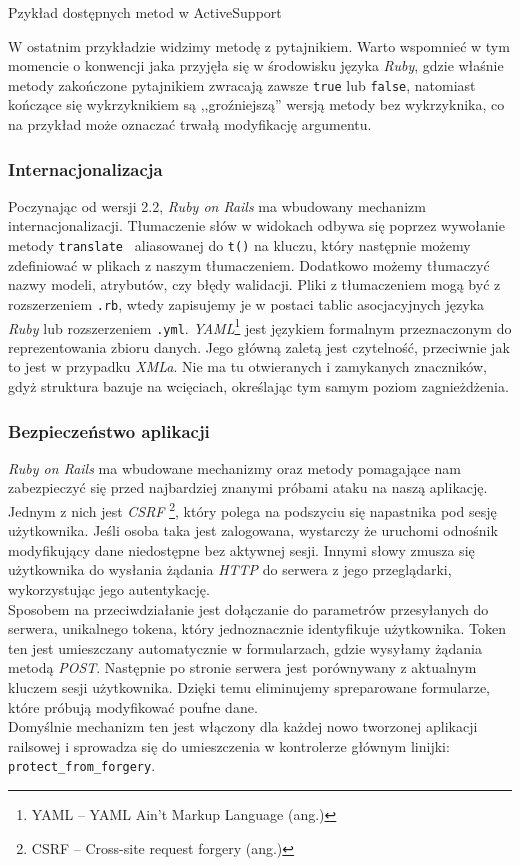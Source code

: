 \documentclass[a4paper,12pt]{article}
\begin{document}
\begin{listing}
  
  \caption{Pzykład dostępnych metod w ActiveSupport}
  \label{listing:activesupport}
\end{listing}


W ostatnim przykładzie widzimy metodę z pytajnikiem. Warto wspomnieć w tym
momencie o konwencji jaka przyjęła się w środowisku języka \emph{Ruby}, gdzie
właśnie metody zakończone pytajnikiem zwracają zawsze \texttt{true} lub \texttt
{false}, natomiast kończące się wykrzyknikiem są ,,groźniejszą'' wersją metody
bez wykrzyknika, co na przykład może oznaczać trwałą modyfikację argumentu.

\subsubsection{Internacjonalizacja}
Poczynając od wersji 2.2, \emph{Ruby on Rails} ma wbudowany mechanizm internacjonalizacji.
Tłumaczenie słów w widokach odbywa się poprzez wywołanie metody \texttt{translate
} aliasowanej do \texttt{t()} na kluczu, który następnie możemy zdefiniować w plikach z
naszym tłumaczeniem. Dodatkowo możemy tłumaczyć nazwy modeli, atrybutów, czy błędy
walidacji. Pliki z tłumaczeniem mogą być z rozszerzeniem \texttt{.rb}, wtedy zapisujemy je
w postaci tablic asocjacyjnych języka \emph{Ruby} lub rozszerzeniem \texttt{.yml}. \emph{
YAML}\footnote{YAML -- YAML Ain't Markup Language (ang.)} jest językiem formalnym
przeznaczonym do reprezentowania zbioru danych. Jego główną zaletą jest czytelność,
przeciwnie jak to jest w przypadku \emph{XMLa}. Nie ma tu otwieranych i zamykanych
znaczników, gdyż struktura bazuje na wcięciach, określając tym samym poziom zagnieżdżenia.


\subsubsection{Bezpieczeństwo aplikacji}
\emph{Ruby on Rails} ma wbudowane mechanizmy oraz metody pomagające nam zabezpieczyć się
przed najbardziej znanymi próbami ataku na naszą aplikację. Jednym z nich jest \emph{CSRF
}\footnote{CSRF -- Cross-site request forgery (ang.)}, który polega na podszyciu się
napastnika pod sesję użytkownika. Jeśli osoba taka jest zalogowana, wystarczy że uruchomi
odnośnik modyfikujący dane niedostępne bez aktywnej sesji. Innymi słowy zmusza się
użytkownika do wysłania żądania \emph{HTTP} do serwera z jego przeglądarki, wykorzystując
jego autentykację.\\
Sposobem na przeciwdziałanie jest dołączanie do parametrów przesyłanych do serwera,
unikalnego tokena, który jednoznacznie identyfikuje użytkownika. Token ten jest umieszczany
automatycznie w formularzach, gdzie wysyłamy żądania metodą \emph{POST}. Następnie po
stronie serwera jest porównywany z aktualnym kluczem sesji użytkownika. Dzięki temu
eliminujemy spreparowane formularze, które próbują modyfikować poufne dane.\\
Domyślnie mechanizm ten jest włączony dla każdej nowo tworzonej aplikacji railsowej i
sprowadza się do umieszczenia w kontrolerze głównym linijki: \texttt{protect\_from\_forgery}.
\end{document}
